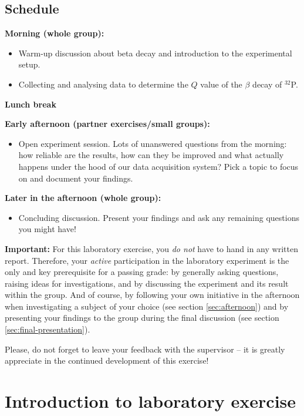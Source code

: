 \documentclass[a4,11pt, notitlepage]{article}
\begin{document}
\subsection{Schedule}

\noindent\textbf{Morning (whole group):} 
\begin{itemize}
\item Warm-up discussion about beta decay and introduction to the
  experimental setup.
\item Collecting and analysing data to determine the $Q$ value of the
  $\beta$ decay of $^{32}$P.
\end{itemize}

\noindent\textbf{Lunch break} 

\noindent\textbf{Early afternoon (partner exercises/small groups):} 
\begin{itemize}
\item Open experiment session. Lots of unanswered questions from the
  morning: how reliable are the results, how can they be improved and
  what actually happens under the hood of our data acquisition system?
  Pick a topic to focus on and document your findings.
\end{itemize}

\noindent\textbf{Later in the afternoon (whole group):} 
\begin{itemize}
\item Concluding discussion. Present your findings and ask any
  remaining questions you might have!
\end{itemize}


\textbf{Important: }For this laboratory exercise, you \emph{do not} have to hand in any
written report. Therefore, your \emph{active} participation in the laboratory experiment is
the only and key prerequisite for a passing grade: by generally asking questions,
raising ideas for investigations, and by discussing the experiment and
its result within the group. And of course, by following your own
initiative in the afternoon when investigating a subject of your
choice (see section \ref{sec:afternoon}) and by presenting your
findings to the group during the final discussion (see section
\ref{sec:final-presentation}).

Please, do not forget to leave your feedback with the supervisor -- it
is greatly appreciate in the continued development of this exercise!

\pagebreak
\section{Introduction to laboratory exercise}
\end{document}
